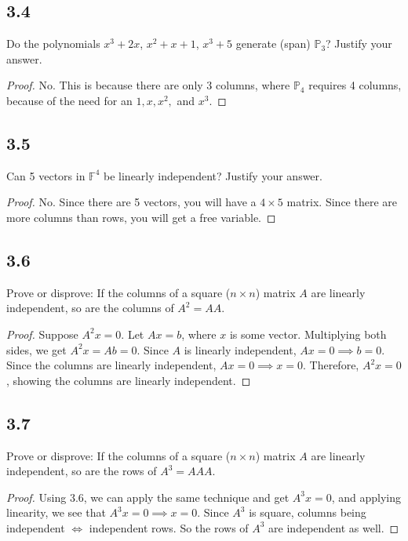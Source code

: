 \documentclass{amsart}
\begin{document}
\subsection*{3.4}
Do the polynomials $x^3+2x$, $x^2+x+1$, $x^3+5$ generate (span) $\mathbb{P}_3$? Justify your answer.
\begin{proof}
    No. This is because there are only 3 columns, where $\mathbb{P}_4$ requires 4 columns, because of the need for an $1,x,x^2,$ and $x^3$. 
\end{proof}

\subsection*{3.5} Can 5 vectors in $\mathbb{F}^4$ be linearly independent? Justify your answer.
\begin{proof}
    No. Since there are 5 vectors, you will have a $4 \times 5$ matrix. Since there are more columns than rows, you will get a free variable. 
\end{proof}

\subsection*{3.6}
Prove or disprove: If the columns of a square ($n\times n$) matrix $A$ are linearly independent, so are the columns of $A^2 = AA$.
\begin{proof}
    Suppose $A^2x=0$. Let $Ax = b$, where $x$ is some vector. Multiplying both sides, we get $A^2x = Ab=0$. Since $A$ is linearly independent, $Ax = 0 \implies b=0$. Since the columns are linearly independent, $Ax = 0 \implies x = 0$. Therefore, $A^2x = 0$, showing the columns are linearly independent. 
\end{proof}

\subsection*{3.7}  Prove or disprove: If the columns of a square ($n\times n$) matrix $A$ are linearly independent, so are the rows of $A^3 = AAA$.
\begin{proof}
    Using 3.6, we can apply the same technique and get $A^3x = 0$, and applying linearity, we see that $A^3x = 0 \implies x = 0$. Since $A^3$ is square, columns being independent $\Longleftrightarrow$ independent rows. So the rows of $A^3$ are independent as well. 
\end{proof}
\end{document}
